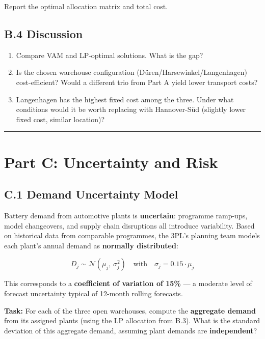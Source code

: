 \documentclass[
  a4paper,
]{article}
\providecommand{\tightlist}{%
  \setlength{\itemsep}{0pt}\setlength{\parskip}{0pt}}
\begin{document}
Report the optimal allocation matrix and total cost.

\subsection{B.4 Discussion}\label{b.4-discussion}

\begin{enumerate}
\def\labelenumi{\arabic{enumi}.}
\tightlist
\item
  Compare VAM and LP-optimal solutions. What is the gap?
\item
  Is the chosen warehouse configuration (Düren/Harsewinkel/Langenhagen)
  cost-efficient? Would a different trio from Part A yield lower
  transport costs?
\item
  Langenhagen has the highest fixed cost among the three. Under what
  conditions would it be worth replacing with Hannover-Süd (slightly
  lower fixed cost, similar location)?
\end{enumerate}

\begin{center}\rule{0.5\linewidth}{0.5pt}\end{center}

\section{Part C: Uncertainty and
Risk}\label{part-c-uncertainty-and-risk}

\subsection{C.1 Demand Uncertainty
Model}\label{c.1-demand-uncertainty-model}

Battery demand from automotive plants is \textbf{uncertain}: programme
ramp-ups, model changeovers, and supply chain disruptions all introduce
variability. Based on historical data from comparable programmes, the
3PL's planning team models each plant's annual demand as
\textbf{normally distributed}:

\[D_j \sim \mathcal{N}(\mu_j, \, \sigma_j^2) \quad \text{with} \quad \sigma_j = 0.15 \cdot \mu_j\]

This corresponds to a \textbf{coefficient of variation of 15\%} --- a
moderate level of forecast uncertainty typical of 12-month rolling
forecasts.

\textbf{Task:} For each of the three open warehouses, compute the
\textbf{aggregate demand} from its assigned plants (using the LP
allocation from B.3). What is the standard deviation of this aggregate
demand, assuming plant demands are \textbf{independent}?
\end{document}
